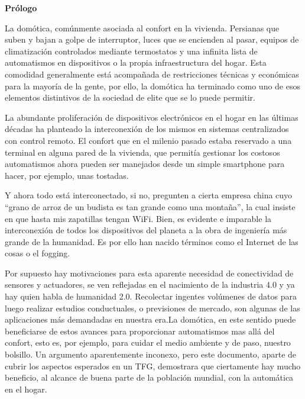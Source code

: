 
\newpage

\thispagestyle{empty}
\begin{center}

{\bf \Huge Prólogo}
\end{center}
\vspace{1cm}


La domótica, comúnmente asociada al confort en la vivienda. Persianas que suben y bajan a golpe de interruptor, luces que se encienden al pasar, equipos de climatización controlados mediante termostatos y una infinita lista de automatismos en dispositivos o la propia infraestructura del hogar. Esta comodidad generalmente está acompañada de restricciones técnicas y económicas para la mayoría de la gente, por ello, la domótica ha terminado como uno de esos elementos distintivos de la sociedad de elite que se lo puede permitir.

\vspace{0.5cm}

La abundante proliferación de dispositivos electrónicos en el hogar en las últimas décadas ha planteado la interconexión de los mismos en sistemas centralizados con control remoto. El confort que en el milenio pasado estaba reservado a una terminal en alguna pared de la vivienda, que permitía gestionar los costosos automatismos ahora pueden ser manejados desde un simple smartphone para hacer, por ejemplo, unas tostadas.

\vspace{0.5cm}

Y ahora todo está interconectado, si no, pregunten a cierta empresa china cuyo “grano de arroz de un budista es tan grande como una montaña”, la cual insiste en que hasta mis zapatillas tengan WiFi. Bien, es evidente e imparable la interconexión de todos los dispositivos del planeta a la obra de ingeniería más grande de la humanidad. Es por ello han nacido términos como el Internet de las cosas o el fogging.

\vspace{0.5cm}

Por supuesto hay motivaciones para esta aparente necesidad de conectividad de sensores y actuadores, se ven reflejadas en el nacimiento de la industria 4.0 y ya hay quien habla de humanidad 2.0. Recolectar ingentes volúmenes de datos para luego realizar estudios conductuales, o previsiones de mercado, son algunas de las aplicaciones más demandadas en nuestra era.La domótica, en este sentido puede beneficiarse de estos avances para proporcionar automatismos mas allá del confort, esto es, por ejemplo, para cuidar el medio ambiente y de paso, nuestro bolsillo. Un argumento aparentemente inconexo, pero este documento, aparte de cubrir los aspectos esperados en un TFG, demostrara que ciertamente hay mucho beneficio, al alcance de buena parte de la población mundial, con la automática en el hogar.
